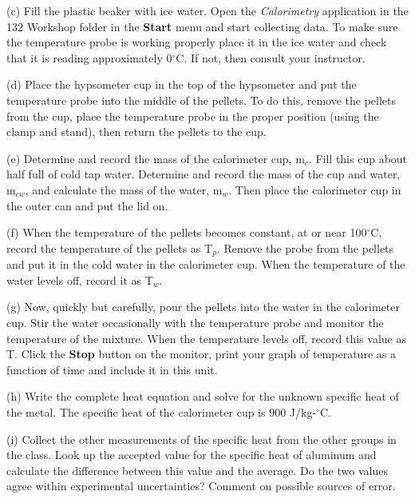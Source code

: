 (c) Fill the plastic beaker with ice water. Open the \textit{Calorimetry}
application in the 132 Workshop folder in the {\bf Start} menu and start
collecting data. To make sure the temperature probe is working 
properly place it in the ice water and
check that it is reading approximately 0\( ^{\circ } \)C. If not,
then consult your instructor.

(d) Place the hypsometer cup in the top of the hypsometer and put the 
temperature probe into the middle of the pellets.  
To do this, remove the pellets from the cup, place the temperature probe in 
the proper position (using the clamp and stand), then return the pellets to the cup.

(e) Determine and record the mass of the calorimeter cup, m\( _{c} \).
Fill this cup about half full of cold tap water. Determine and record
the mass of the cup and water, m\( _{cw} \), and calculate the mass
of the water, m\( _{w} \). Then place the calorimeter cup in the outer
can and put the lid on.
\vspace{15mm}

(f) When the temperature of the pellets becomes constant, at or near
100\( ^{\circ } \)C, record the temperature of the pellets as T\( _{p} \).
Remove the probe from the pellets and put it in the cold water in the calorimeter cup. 
When the temperature of the water levels off, record it as T\( _{w} \).
\vspace{15mm}

(g) Now, quickly but carefully, pour the pellets into the water in
the calorimeter cup. Stir the water occasionally with the temperature probe and
monitor the temperature of the mixture. When the temperature levels off, record
this value as T. Click the {\bf Stop} button on the monitor, 
print your graph of temperature as a function of time and include it in this unit.
\vspace{15mm}

\newpage 

(h) Write the complete heat equation and solve for the unknown specific
heat of the metal. 
The specific heat of the calorimeter cup is 900 J/kg-\( ^{\circ } \)C.
\vspace{2in}

(i) Collect the other measurements of the specific heat from the other groups in
the class. 
Look up the accepted value for the specific heat of aluminum and
calculate the difference  between this value and the average.
Do the two values agree within experimental uncertainties?
Comment on possible sources of error.
\vspace{20mm}

